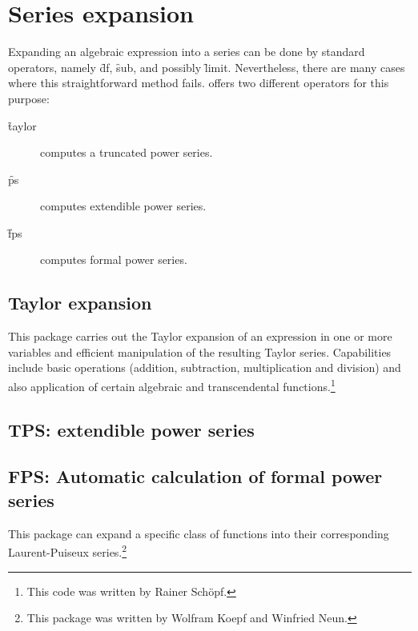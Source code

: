 \chapter{Series expansion}

Expanding an algebraic expression into a series can be done by standard \REDUCE operators, namely \f{df}, \f{sub}, and possibly \f{limit}.
Nevertheless, there are many cases where this straightforward method fails.
\REDUCE offers two different operators for this purpose:
\begin{description}
\item[\f{taylor}] computes a truncated power series.
\item[\f{ps}] computes extendible power series.
  \item[\f{fps}] computes formal power series.
\end{description}

\section{Taylor expansion}
This package carries out the Taylor expansion of an expression in one
or more variables and efficient manipulation of the resulting Taylor
series. Capabilities include basic operations (addition, subtraction,
multiplication and division) and also application of certain algebraic
and transcendental functions.\footnote{This code was written by Rainer Schöpf.}



\section{TPS: extendible power series}


\newpage

\section{FPS: Automatic calculation of formal power series}

This package can expand a specific class of functions into their
corresponding Laurent-Puiseux series.\footnote{This package was written by Wolfram Koepf and Winfried Neun.}



